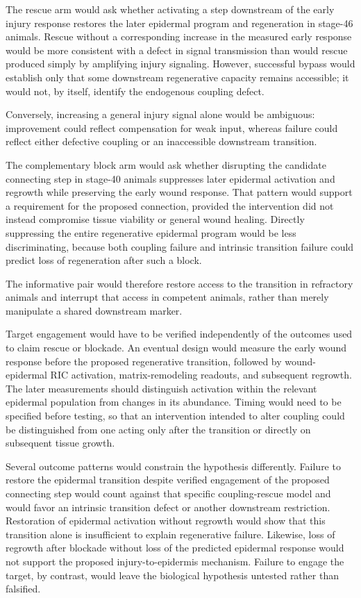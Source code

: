 \documentclass[11pt]{article}
\begin{document}
The rescue arm would ask whether activating a step downstream of the early injury response restores the later epidermal program and regeneration in stage-46 animals. Rescue without a corresponding increase in the measured early response would be more consistent with a defect in signal transmission than would rescue produced simply by amplifying injury signaling. However, successful bypass would establish only that some downstream regenerative capacity remains accessible; it would not, by itself, identify the endogenous coupling defect.

Conversely, increasing a general injury signal alone would be ambiguous: improvement could reflect compensation for weak input, whereas failure could reflect either defective coupling or an inaccessible downstream transition.

The complementary block arm would ask whether disrupting the candidate connecting step in stage-40 animals suppresses later epidermal activation and regrowth while preserving the early wound response. That pattern would support a requirement for the proposed connection, provided the intervention did not instead compromise tissue viability or general wound healing. Directly suppressing the entire regenerative epidermal program would be less discriminating, because both coupling failure and intrinsic transition failure could predict loss of regeneration after such a block.

The informative pair would therefore restore access to the transition in refractory animals and interrupt that access in competent animals, rather than merely manipulate a shared downstream marker.

Target engagement would have to be verified independently of the outcomes used to claim rescue or blockade. An eventual design would measure the early wound response before the proposed regenerative transition, followed by wound-epidermal RIC activation, matrix-remodeling readouts, and subsequent regrowth. The later measurements should distinguish activation within the relevant epidermal population from changes in its abundance. Timing would need to be specified before testing, so that an intervention intended to alter coupling could be distinguished from one acting only after the transition or directly on subsequent tissue growth.

Several outcome patterns would constrain the hypothesis differently. Failure to restore the epidermal transition despite verified engagement of the proposed connecting step would count against that specific coupling-rescue model and would favor an intrinsic transition defect or another downstream restriction. Restoration of epidermal activation without regrowth would show that this transition alone is insufficient to explain regenerative failure. Likewise, loss of regrowth after blockade without loss of the predicted epidermal response would not support the proposed injury-to-epidermis mechanism. Failure to engage the target, by contrast, would leave the biological hypothesis untested rather than falsified.
\end{document}
